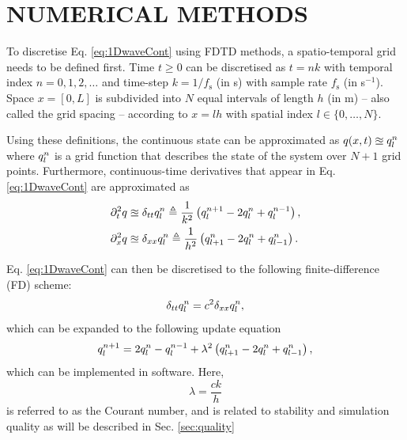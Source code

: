 \documentclass[fleqn]{jaes}
\begin{document}
\section{NUMERICAL METHODS}\label{sec:numericalMethods}
To discretise Eq. \eqref{eq:1DwaveCont} using FDTD methods, a spatio-temporal grid needs to be defined first. 
Time $t\geq 0$ can be discretised as $t = nk$ with temporal index $n = 0, 1, 2, \hdots$ and time-step $k = 1/f_\text{s}$ (in s) with sample rate $f_\text{s}$ (in s$^{-1}$). Space $x = [0, L]$ is subdivided into $N$ equal intervals of length $h$ (in m) -- also called the grid spacing -- according to $x = lh$ with spatial index $l\in \{0, \hdots, N\}$. 

Using these definitions, the continuous state can be approximated as $q(x,t) \approxeq q_l^n$ where $q_l^n$ is a grid function that describes the state of the system over $N+1$ grid points. Furthermore, continuous-time derivatives that appear in Eq. \eqref{eq:1DwaveCont} are approximated as
\begin{subequations}
\begin{align}
    \partial_t^2 q &\approxeq \delta_{tt} q_l^n \triangleq \frac{1}{k^2}\left(q_l^{n+1} - 2 q_l^n + q_l^{n-1}\right),\\
    \partial_x^2 q &\approxeq \delta_{xx} q_l^n \triangleq \frac{1}{h^2}\left(q_{l+1}^n - 2 q_l^n + q_{l-1}^n\right).
\end{align}
\end{subequations}

Eq. \eqref{eq:1DwaveCont} can then be discretised to the following finite-difference (FD) scheme:
\begin{equation}\label{eq:1dWaveDisc}
    \dtt \qln = c^2 \dxx \qln,
\end{equation}
which can be expanded to the following update equation
\begin{equation}\label{eq:1DwaveUpdate}
    q_l^{n+1} = 2 \qln - q_l^{n-1} + \lambda^2 \left(q_{l+1}^n -2\qln + q_{l-1}^n\right),
\end{equation}
which can be implemented in software. Here, 
\begin{equation}\label{eq:courant}
    \lambda = \frac{c k}{h}
\end{equation} is referred to as the Courant number, and is related to stability and simulation quality as will be described in Sec. \ref{sec:quality}
\end{document}
